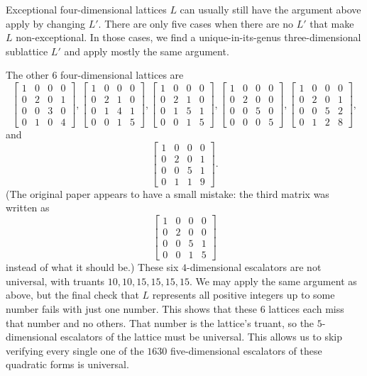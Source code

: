 \documentclass{article}
\begin{document}
Exceptional four-dimensional lattices $L$ can usually still have the argument above apply by changing $L'$. There are only five cases when there are no $L'$ that make $L$ non-exceptional. In those cases, we find a unique-in-its-genus three-dimensional sublattice $L'$ and apply mostly the same argument.

The other $6$ four-dimensional lattices are
\[\begin{bmatrix} 1 & 0 & 0 & 0 \\ 0 & 2 & 0 & 1 \\ 0 & 0 & 3 & 0 \\ 0 & 1 & 0 & 4 \end{bmatrix}, \begin{bmatrix} 1 & 0 & 0 & 0 \\ 0 & 2 & 1 & 0 \\ 0 & 1 & 4 & 1 \\ 0 & 0 & 1 & 5 \end{bmatrix}, \begin{bmatrix} 1 & 0 & 0 & 0 \\ 0 & 2 & 1 & 0 \\ 0 & 1 & 5 & 1 \\ 0 & 0 & 1 & 5 \end{bmatrix}, \begin{bmatrix} 1 & 0 & 0 & 0 \\ 0 & 2 & 0 & 0 \\ 0 & 0 & 5 & 0 \\ 0 & 0 & 0 & 5 \end{bmatrix}, \begin{bmatrix} 1 & 0 & 0 & 0 \\ 0 & 2 & 0 & 1 \\ 0 & 0 & 5 & 2 \\ 0 & 1 & 2 & 8 \end{bmatrix},\]
and
\[\begin{bmatrix} 1 & 0 & 0 & 0 \\ 0 & 2 & 0 & 1 \\ 0 & 0 & 5 & 1 \\ 0 & 1 & 1 & 9 \end{bmatrix}.\]
(The original paper appears to have a small mistake: the third matrix was written as
\[\begin{bmatrix} 1&0&0&0 \\ 0&2&0&0 \\ 0&0&5&1 \\ 0&0&1&5\end{bmatrix}\]
instead of what it should be.)
These six $4$-dimensional escalators are not universal, with truants $10,10,15,15,15,15$. We may apply the same argument as above, but the final check that $L$ represents all positive integers up to some number fails with just one number. This shows that these $6$ lattices each miss that number and no others. That number is the lattice's truant, so the $5$-dimensional escalators of the lattice must be universal. This allows us to skip verifying every single one of the $1630$ five-dimensional escalators of these quadratic forms is universal.
\end{document}
